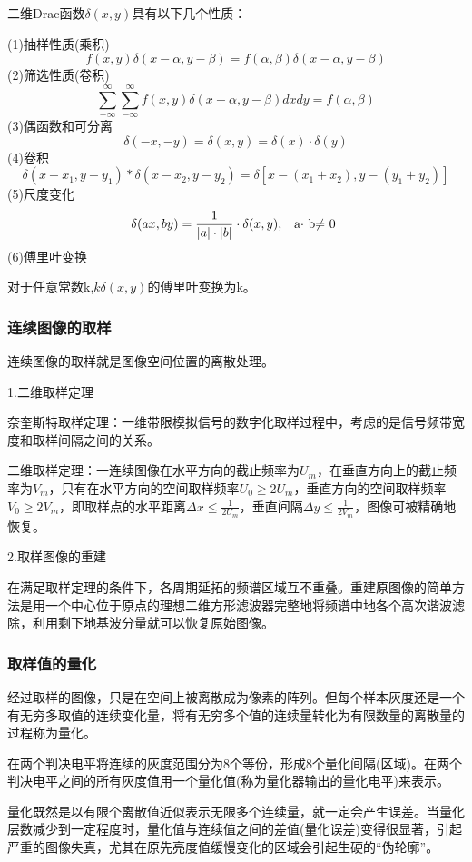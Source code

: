 \documentclass[11pt]{article}
\begin{document}
二维Drac函数$\delta(x,y)$具有以下几个性质：

\noindent(1)抽样性质(乘积)$$f(x,y)\delta(x-\alpha,y-\beta)=f(\alpha,\beta)\delta(x-\alpha,y-\beta)$$
\noindent(2)筛选性质(卷积)$$\sum_{-\infty}^{\infty}\sum_{-\infty}^{\infty}f(x,y)\delta(x-\alpha,y-\beta)dxdy=f(\alpha,\beta)$$
\noindent(3)偶函数和可分离$$\delta(-x,-y)=\delta(x,y)=\delta(x)\cdot\delta(y)$$
\noindent(4)卷积$$\delta(x-x_1,y-y_1)\ast\delta(x-x_2,y-y_2)=\delta[x-(x_1+x_2),y-(y_1+y_2)]$$
\noindent(5)尺度变化$$\delta(ax,by)=\frac{1}{\left|a\right |\cdot \left|b\right |}\cdot\delta(x,y)\text{,\quad a$\cdot$ b$\neq$ 0 }$$
\noindent(6)傅里叶变换

\noindent 对于任意常数k,$k\delta(x,y)$的傅里叶变换为k。
\subsubsection{连续图像的取样}
连续图像的取样就是图像空间位置的离散处理。

1.二维取样定理

奈奎斯特取样定理：一维带限模拟信号的数字化取样过程中，考虑的是信号频带宽度和取样间隔之间的关系。

二维取样定理：一连续图像在水平方向的截止频率为$U_m$，在垂直方向上的截止频率为$V_m$，只有在水平方向的空间取样频率$U_0\geqslant2U_m$，垂直方向的空间取样频率$V_0\geqslant2V_m$，即取样点的水平距离$\Delta x\leqslant\frac{1}{2U_m}$，垂直间隔$\Delta y \leqslant\frac{1}{2V_m}$，图像可被精确地恢复。

2.取样图像的重建

在满足取样定理的条件下，各周期延拓的频谱区域互不重叠。重建原图像的简单方法是用一个中心位于原点的理想二维方形滤波器完整地将频谱中地各个高次谐波滤除，利用剩下地基波分量就可以恢复原始图像。

\subsubsection{取样值的量化}
经过取样的图像，只是在空间上被离散成为像素的阵列。但每个样本灰度还是一个有无穷多取值的连续变化量，将有无穷多个值的连续量转化为有限数量的离散量的过程称为量化。

在两个判决电平将连续的灰度范围分为8个等份，形成8个量化间隔(区域)。在两个判决电平之间的所有灰度值用一个量化值(称为量化器输出的量化电平)来表示。

量化既然是以有限个离散值近似表示无限多个连续量，就一定会产生误差。当量化层数减少到一定程度时，量化值与连续值之间的差值(量化误差)变得很显著，引起严重的图像失真，尤其在原先亮度值缓慢变化的区域会引起生硬的“伪轮廓”。
\end{document}
